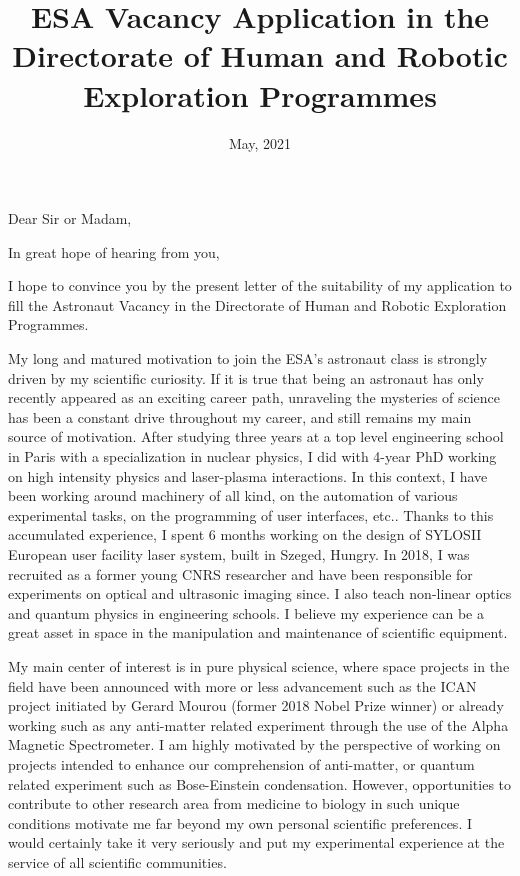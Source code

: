 \documentclass[11pt,a4paper,sans]{moderncv}        %
\title{ESA Vacancy Application in the Directorate of Human and Robotic Exploration Programmes}                               %
\begin{document}
\date{May, 2021}
\opening{Dear Sir or Madam,}
\closing{In great hope of hearing from you,}
\makelettertitle

\justify
I hope to convince you by the present letter of the suitability of my application to fill the Astronaut Vacancy in the Directorate of Human and Robotic Exploration Programmes.

My long and matured motivation to join the ESA's astronaut class is strongly driven by my scientific curiosity. If it is true that being an astronaut has only recently appeared as an exciting career path, unraveling the mysteries of science has been a constant drive throughout my career, and still remains my main source of motivation. After studying three years at a top level engineering school in Paris with a specialization in nuclear physics, I did with 4-year PhD working on high intensity physics and laser-plasma interactions. In this context, I have been working around machinery of all kind, on the automation of various experimental tasks, on the programming of user interfaces, etc.. Thanks to this accumulated experience, I spent 6 months working on the design of SYLOSII European user facility laser system, built in Szeged, Hungry. In 2018, I was recruited as a former young CNRS researcher and have been responsible for experiments on optical and ultrasonic imaging since. I also teach non-linear optics and quantum physics in engineering schools. I believe my experience can be a great asset in space in the manipulation and maintenance of scientific equipment.

My main center of interest is in pure physical science, where space projects in the field have been announced with more or less advancement such as the ICAN project initiated by Gerard Mourou (former 2018 Nobel Prize winner) or already working such as any anti-matter related experiment through the use of the Alpha Magnetic Spectrometer. I am highly motivated by the perspective of working on projects intended to enhance our comprehension of anti-matter, or quantum related experiment such as Bose-Einstein condensation. However, opportunities to contribute to other research area from medicine to biology in such unique conditions motivate me far beyond my own personal scientific preferences. I would certainly take it very seriously and put my experimental experience at the service of all scientific communities.
\end{document}
